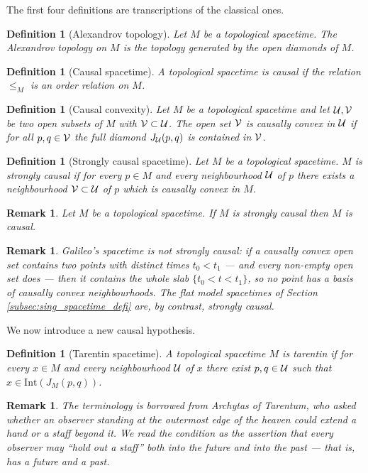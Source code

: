 \documentclass[a4paper,twoside]{article}
\newtheorem{defi}[lem]{Definition}
\newtheorem{rem}[lem]{Remark}
\begin{document}
The first four definitions are transcriptions of the classical ones.

\begin{defi}[Alexandrov topology]\label{def:alexandrov_topology} Let $M$ be a topological spacetime.
The Alexandrov topology on $M$ is the topology generated by the open diamonds of $M$.
\end{defi}

\begin{defi}[Causal spacetime]\label{def:causal_spacetime}
A topological spacetime is causal if the relation $\leq_M$ is an order relation on $M$.
\end{defi}

\begin{defi}[Causal convexity]\label{defi:convexite_causale}Let $M$ be a topological spacetime and let $\mathcal{U},\mathcal V$ be two open subsets of $M$ with $\mathcal V\subset\mathcal{U}$.
The open set $\mathcal V$ is {\it causally convex in $\mathcal{U}$} if for all $p,q\in \mathcal V$
the full diamond $J_{\mathcal{U}}(p,q)$ is contained in $\mathcal V$.
\end{defi}

\begin{defi}[Strongly causal spacetime]\label{def:strongly_causal_spacetime}
Let $M$ be a topological spacetime. $M$ is strongly causal if
for every $p\in M$ and every neighbourhood $\mathcal{U}$ of $p$ there exists a neighbourhood $\mathcal V\subset \mathcal{U}$ of $p$
which is causally convex in $M$.
\end{defi}
\begin{rem}\label{rem:topological_spacetime_strongly_causal} Let $M$ be a topological spacetime. If $M$ is strongly causal then $M$ is causal.
\end{rem}

\begin{rem}\label{rem:galileo_spacetime_not_strongly} Galileo's spacetime is not strongly causal: if a causally convex open set contains two
points with distinct times $t_0<t_1$ --- and every non-empty open set does --- then it contains the
whole slab $\{t_0<t<t_1\}$, so no point has a basis of causally convex neighbourhoods. The flat
model spacetimes of Section \ref{subsec:sing_spacetime_defi} are, by contrast, strongly causal.
\end{rem}

We now introduce a new causal hypothesis.
\begin{defi}[Tarentin spacetime]\label{def:tarentin_spacetime}
A topological spacetime $M$ is tarentin if for every $x\in M$ and every neighbourhood $\mathcal{U}$ of $x$
there exist $p,q\in \mathcal{U}$ such that $x\in \mathrm{Int}\left(J_M(p,q)\right)$.
\end{defi}
\begin{rem}\label{rem:terminology_borrowed_archytas_tarentum}
The terminology is borrowed from Archytas of Tarentum, who asked whether an observer standing at
the outermost edge of the heaven could extend a hand or a staff beyond it. We read the condition
as the assertion that every observer may ``hold out a staff'' both into the future and into the
past --- that is, has a future and a past.
\end{rem}
\end{document}
